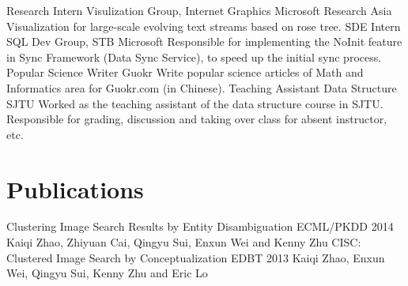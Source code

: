 \documentclass[10pt,a4paper,roman]{moderncv} %
\begin{document}
        {Research Intern}
        {Visulization Group, Internet Graphics}
        {Microsoft Research Asia}
        {}
        {Visualization for large-scale evolving text streams based on rose tree.\footnotemark[1]{}}
        {SDE Intern}
        {SQL Dev Group, STB}
        {Microsoft}
        {}
        {Responsible for implementing the NoInit feature in Sync Framework (Data Sync Service), to speed up the initial sync process.}
        {Popular Science Writer}
        {Guokr\footnotemark[2]{}}
        {}
        {}
        {Write popular science articles\footnotemark[3]{} of Math and Informatics area for Guokr.com (in Chinese).}
        {Teaching Assistant}
        {Data Structure}
        {SJTU}
        {}
        {Worked as the teaching assistant of the data structure course in SJTU.\newline{}%
         Responsible for grading, discussion and taking over class for absent instructor\footnotemark[4]{}, etc.}

\section{Publications}
        {Clustering Image Search Results by Entity Disambiguation}
        {ECML/PKDD 2014}{}{}
        {Kaiqi Zhao, Zhiyuan Cai, Qingyu Sui, Enxun Wei and Kenny Zhu}
        {CISC: Clustered Image Search by Conceptualization}
        {EDBT 2013}{}{}
        {Kaiqi Zhao, Enxun Wei, Qingyu Sui, Kenny Zhu and Eric Lo}
\end{document}
